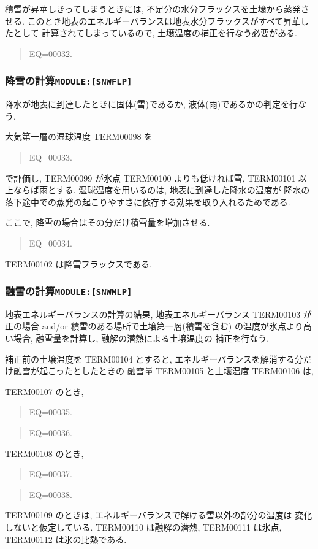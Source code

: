 積雪が昇華しきってしまうときには, 不足分の水分フラックスを土壌から蒸発させる. 
このとき地表のエネルギーバランスは地表水分フラックスがすべて昇華したとして
計算されてしまっているので, 土壌温度の補正を行なう必要がある. 
\begin{quote}
EQ=00032.
\end{quote}

\subsubsection{降雪の計算\texttt{MODULE:[SNWFLP]}}

降水が地表に到達したときに固体(雪)であるか, 液体(雨)であるかの判定を行なう. 

大気第一層の湿球温度 TERM00098 を
\begin{quote}
EQ=00033.
\end{quote}
で評価し, TERM00099 が氷点 TERM00100 よりも低ければ雪, TERM00101 以上ならば雨とする. 
湿球温度を用いるのは, 地表に到達した降水の温度が
降水の落下途中での蒸発の起こりやすさに依存する効果を取り入れるためである. 

ここで, 降雪の場合はその分だけ積雪量を増加させる. 
\begin{quote}
EQ=00034.
\end{quote}
TERM00102 は降雪フラックスである. 

\subsubsection{融雪の計算\texttt{MODULE:[SNWMLP]}}

地表エネルギーバランスの計算の結果, 地表エネルギーバランス TERM00103 が正の場合
 and/or 積雪のある場所で土壌第一層(積雪を含む)
の温度が氷点より高い場合, 融雪量を計算し, 融解の潜熱による土壌温度の
補正を行なう. 

補正前の土壌温度を TERM00104 とすると, 
エネルギーバランスを解消する分だけ融雪が起こったとしたときの
融雪量 TERM00105 と土壌温度 TERM00106 は, 

TERM00107 のとき, 
\begin{quote}
EQ=00035.
\end{quote}
\begin{quote}
EQ=00036.
\end{quote}
TERM00108 のとき, 
\begin{quote}
EQ=00037.
\end{quote}
\begin{quote}
EQ=00038.
\end{quote}
TERM00109 のときは, エネルギーバランスで解ける雪以外の部分の温度は
変化しないと仮定している. 
TERM00110 は融解の潜熱, TERM00111 は氷点, TERM00112 は氷の比熱である. 

